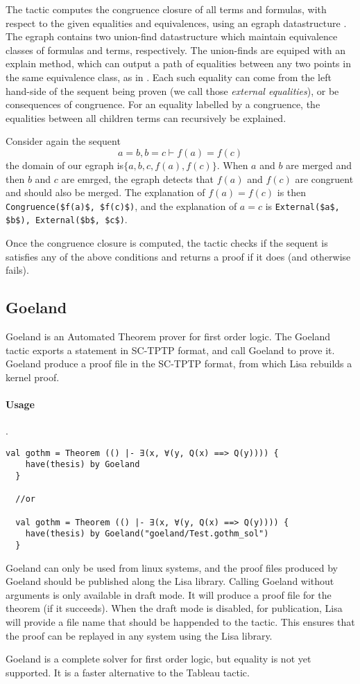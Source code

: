 The tactic computes the congruence closure of all terms and formulas, with respect to the given equalities and equivalences, using an egraph datastructure \cite{willseyEggFastExtensible2021, nelsonFastDecisionProcedures1980}. The egraph contains two union-find datastructure which maintain equivalence classes of formulas and terms, respectively. The union-finds are equiped with an explain method, which can output a path of equalities between any two points in the same equivalence class, as in \cite{nelsonFastDecisionProcedures1980}. Each such equality can come from the left hand-side of the sequent being proven (we call those \textit{external equalities}), or be consequences of congruence. For an equality labelled by a congruence, the equalities between all children terms can recursively be explained.

\begin{example}
  Consider again the sequent
  $$
  a = b, b = c \vdash f(a) = f(c)
  $$
  the domain of our egraph is$\lbrace a, b, c, f(a), f(c) \rbrace$. When $a$ and $b$ are merged and then $b$ and $c$ are emrged, the egraph detects that $f(a)$ and $f(c)$ are congruent and should also be merged. The explanation of $f(a) = f(c)$ is then \lstinline|Congruence($f(a)$, $f(c)$)|, and the explanation of $a = c$ is \lstinline|External($a$, $b$), External($b$, $c$)|.
\end{example}

Once the congruence closure is computed, the tactic checks if the sequent is satisfies any of the above conditions and returns a proof if it does (and otherwise fails).

\subsection*{Goeland}
Goeland\cite{DBLP:conf/cade/CaillerRDRB22} is an Automated Theorem prover for first order logic. The Goeland tactic exports a statement in SC-TPTP format, and call Goeland to prove it. Goeland produce a proof file in the SC-TPTP format, from which Lisa rebuilds a kernel proof.
\paragraph*{Usage}.
\newline\begin{lstlisting}[language=lisa, frame=single]
  val gothm = Theorem (() |- ∃(x, ∀(y, Q(x) ==> Q(y)))) {
    have(thesis) by Goeland
  }

  //or

  val gothm = Theorem (() |- ∃(x, ∀(y, Q(x) ==> Q(y)))) {
    have(thesis) by Goeland("goeland/Test.gothm_sol")
  }
\end{lstlisting}
Goeland can only be used from linux systems, and the proof files produced by Goeland should be published along the Lisa library. Calling Goeland without arguments is only available in draft mode. It will produce a proof file for the theorem (if it succeeds). When the draft mode is disabled, for publication, Lisa will provide a file name that should be happended to the tactic. This ensures that the proof can be replayed in any system using the Lisa library.

Goeland is a complete solver for first order logic, but equality is not yet supported. It is a faster alternative to the Tableau tactic.